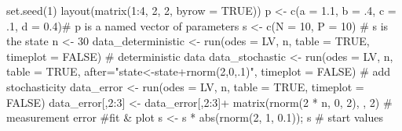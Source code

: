 \documentclass[
  a4paper,
  DIV=11,
  numbers=noendperiod,
  oneside]{scrreprt}
\newenvironment{Shaded}{}{}
\newcommand{\AttributeTok}[1]{\textcolor[rgb]{0.84,0.23,0.29}{#1}}
\newcommand{\CommentTok}[1]{\textcolor[rgb]{0.42,0.45,0.49}{#1}}
\newcommand{\ConstantTok}[1]{\textcolor[rgb]{0.00,0.36,0.77}{#1}}
\newcommand{\DecValTok}[1]{\textcolor[rgb]{0.00,0.36,0.77}{#1}}
\newcommand{\FloatTok}[1]{\textcolor[rgb]{0.00,0.36,0.77}{#1}}
\newcommand{\FunctionTok}[1]{\textcolor[rgb]{0.44,0.26,0.76}{#1}}
\newcommand{\NormalTok}[1]{\textcolor[rgb]{0.14,0.16,0.18}{#1}}
\newcommand{\OtherTok}[1]{\textcolor[rgb]{0.44,0.26,0.76}{#1}}
\newcommand{\SpecialCharTok}[1]{\textcolor[rgb]{0.00,0.36,0.77}{#1}}
\newcommand{\StringTok}[1]{\textcolor[rgb]{0.01,0.18,0.38}{#1}}
\begin{document}
\begin{Shaded}
\begin{Highlighting}[]
\FunctionTok{set.seed}\NormalTok{(}\DecValTok{1}\NormalTok{)}
\FunctionTok{layout}\NormalTok{(}\FunctionTok{matrix}\NormalTok{(}\DecValTok{1}\SpecialCharTok{:}\DecValTok{4}\NormalTok{, }\DecValTok{2}\NormalTok{, }\DecValTok{2}\NormalTok{, }\AttributeTok{byrow =} \ConstantTok{TRUE}\NormalTok{))}
\NormalTok{p }\OtherTok{\textless{}{-}} \FunctionTok{c}\NormalTok{(}\AttributeTok{a =} \FloatTok{1.1}\NormalTok{, }\AttributeTok{b =}\NormalTok{ .}\DecValTok{4}\NormalTok{, }\AttributeTok{c =}\NormalTok{ .}\DecValTok{1}\NormalTok{, }\AttributeTok{d =} \FloatTok{0.4}\NormalTok{)}\CommentTok{\# p is a named vector of parameters}
\NormalTok{s }\OtherTok{\textless{}{-}} \FunctionTok{c}\NormalTok{(}\AttributeTok{N =} \DecValTok{10}\NormalTok{, }\AttributeTok{P =} \DecValTok{10}\NormalTok{) }\CommentTok{\# s is the state}
\NormalTok{n }\OtherTok{\textless{}{-}} \DecValTok{30}
\NormalTok{data\_deterministic }\OtherTok{\textless{}{-}} \FunctionTok{run}\NormalTok{(}\AttributeTok{odes =}\NormalTok{ LV, n, }\AttributeTok{table =} \ConstantTok{TRUE}\NormalTok{,}
        \AttributeTok{timeplot =} \ConstantTok{FALSE}\NormalTok{) }\CommentTok{\# deterministic data}
\NormalTok{data\_stochastic }\OtherTok{\textless{}{-}} \FunctionTok{run}\NormalTok{(}\AttributeTok{odes =}\NormalTok{ LV, n, }\AttributeTok{table =} \ConstantTok{TRUE}\NormalTok{, }
        \AttributeTok{after=}\StringTok{"state\textless{}{-}state+rnorm(2,0,.1)"}\NormalTok{, }\AttributeTok{timeplot =}
        \ConstantTok{FALSE}\NormalTok{) }\CommentTok{\# add stochasticity}
\NormalTok{data\_error }\OtherTok{\textless{}{-}} \FunctionTok{run}\NormalTok{(}\AttributeTok{odes =}\NormalTok{ LV, n, }\AttributeTok{table =} \ConstantTok{TRUE}\NormalTok{, }\AttributeTok{timeplot =} \ConstantTok{FALSE}\NormalTok{)}
\NormalTok{data\_error[,}\DecValTok{2}\SpecialCharTok{:}\DecValTok{3}\NormalTok{] }\OtherTok{\textless{}{-}}\NormalTok{ data\_error[,}\DecValTok{2}\SpecialCharTok{:}\DecValTok{3}\NormalTok{]}\SpecialCharTok{+}
    \FunctionTok{matrix}\NormalTok{(}\FunctionTok{rnorm}\NormalTok{(}\DecValTok{2} \SpecialCharTok{*}\NormalTok{ n, }\DecValTok{0}\NormalTok{, }\DecValTok{2}\NormalTok{), , }\DecValTok{2}\NormalTok{) }\CommentTok{\# measurement error }
\CommentTok{\#fit \& plot}
\NormalTok{s }\OtherTok{\textless{}{-}}\NormalTok{ s }\SpecialCharTok{*} \FunctionTok{abs}\NormalTok{(}\FunctionTok{rnorm}\NormalTok{(}\DecValTok{2}\NormalTok{, }\DecValTok{1}\NormalTok{, }\FloatTok{0.1}\NormalTok{)); s }\CommentTok{\# start values}

\end{Highlighting}
\end{Shaded}
\end{document}
